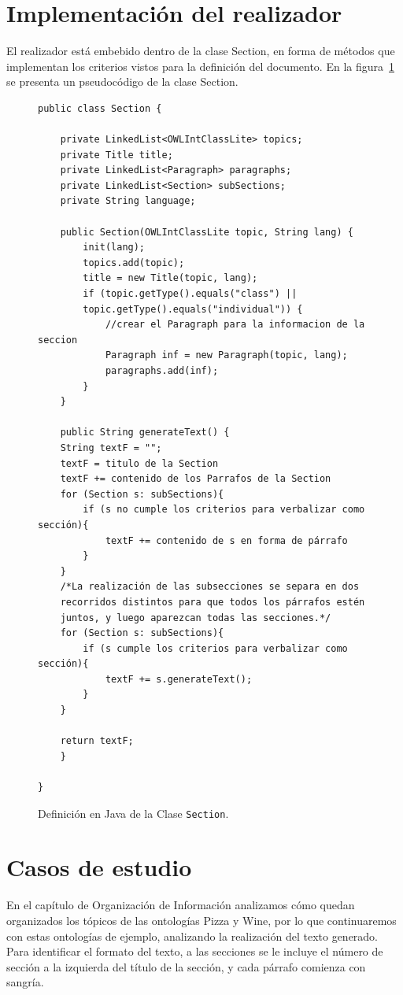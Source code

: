 \section{Implementación del realizador}
El realizador está embebido dentro de la clase Section, en forma de métodos que implementan los criterios vistos para la definición del documento. En la figura~\ref{fig:clase_section} se presenta un pseudocódigo de la clase Section.

\begin{figure}
\begin{verbatim}
public class Section {

    private LinkedList<OWLIntClassLite> topics;
    private Title title;
    private LinkedList<Paragraph> paragraphs;
    private LinkedList<Section> subSections;
    private String language;

    public Section(OWLIntClassLite topic, String lang) {
        init(lang);
        topics.add(topic);
        title = new Title(topic, lang);
        if (topic.getType().equals("class") ||
        topic.getType().equals("individual")) {
            //crear el Paragraph para la informacion de la seccion
            Paragraph inf = new Paragraph(topic, lang);
            paragraphs.add(inf);
        } 
    }
    
    public String generateText() {
    String textF = "";
    textF = titulo de la Section
    textF += contenido de los Parrafos de la Section
    for (Section s: subSections){
        if (s no cumple los criterios para verbalizar como sección){
            textF += contenido de s en forma de párrafo
        }
    }
    /*La realización de las subsecciones se separa en dos
    recorridos distintos para que todos los párrafos estén
    juntos, y luego aparezcan todas las secciones.*/
    for (Section s: subSections){
        if (s cumple los criterios para verbalizar como sección){
            textF += s.generateText();
        }
    }
    
    return textF;
    }
    
}
\end{verbatim}
\caption{Definición en Java de la Clase \texttt{Section}.}
\label{fig:clase_section}
\end{figure}


\section{Casos de estudio}
En el capítulo de Organización de Información analizamos cómo quedan organizados los tópicos de las ontologías Pizza y Wine, por lo que continuaremos con estas ontologías de ejemplo, analizando la realización del texto generado. Para identificar el formato del texto, a las secciones se le incluye el número de sección a la izquierda del título de la sección, y cada párrafo comienza con sangría.

